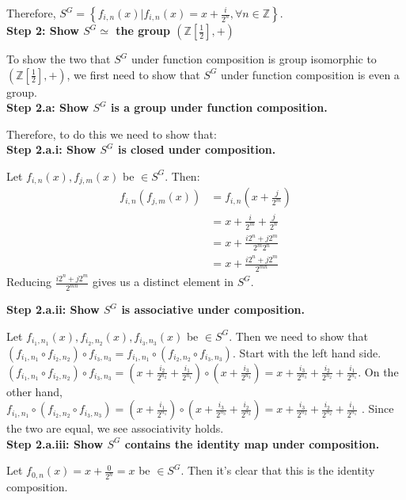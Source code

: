 \documentclass[12pt]{article}%
\newcommand{\Z}{\mathbb{Z}}
\begin{document}
Therefore, $S^G=\left\{f_{i,n}(x)|f_{i,n}(x)=x+\frac{i}{2^{n}}, \forall n\in \Z\right\}$.\\

\textbf{Step 2: Show $S^G\simeq$  the group $\left(\Z\left[\frac{1}{2}\right],+\right)$}

To show the two that $S^G$ under function composition is group isomorphic to
$\left(\Z\left[\frac{1}{2}\right],+\right)$, we first need to show that $S^G$ under function composition
is even a group. \\

\textbf{Step 2.a: Show $S^G$ is a group under function composition.}

Therefore, to do this we need to show that: \\

\textbf{Step 2.a.i: Show $S^G$ is closed under composition.}

Let $f_{i,n}(x), f_{j,m}(x)$ be $\in S^G$. Then: 
\begin{align*}
f_{i,n}(f_{j,m}(x))
&=f_{i,n}(x+\frac{j}{2^{m}}) \\
&=x+\frac{i}{2^{m}}+\frac{j}{2^{n}} \\
&=x+\frac{i2^{n}+j2^{m}}{2^{m}2^{n}} \\
&=x+\frac{i2^{n}+j2^{m}}{2^{mn}}
\end{align*}
Reducing $\frac{i2^{n}+j2^{m}}{2^{mn}}$ gives us a distinct element in $S^G$.

\textbf{Step 2.a.ii: Show $S^G$ is associative under composition.}

Let $f_{i_1,n_1}(x), f_{i_2,n_2}(x), f_{i_3,n_3}(x)$ be $\in S^G$. Then we need to show that
$(f_{i_1,n_1}\circ f_{i_2,n_2}) \circ f_{i_3,n_3}=f_{i_1,n_1}\circ (f_{i_2,n_2} \circ f_{i_3,n_3})$.
Start with the left hand side.
$(f_{i_1,n_1}\circ f_{i_2,n_2}) \circ f_{i_3,n_3} = (x+\frac{i_2}{2^{n_2}}+\frac{i_1}{2^{n_1}}) \circ (x+\frac{i_3}{2^{n_3}}) = x+\frac{i_3}{2^{n_3}}+\frac{i_2}{2^{n_2}}+\frac{i_1}{2^{n_1}}$. On the other
hand, $f_{i_1,n_1}\circ (f_{i_2,n_2} \circ f_{i_3,n_3})=(x+\frac{i_1}{2^{n_1}})\circ (x+\frac{i_3}{2^{n_3}}+\frac{i_2}{2^{n_2}})=x+\frac{i_3}{2^{n_3}}+\frac{i_2}{2^{n_2}}+\frac{i_1}{2^{n_1}}$
. Since the two are equal, we see associativity holds. \\

\textbf{Step 2.a.iii: Show $S^G$ contains the identity map under composition.}

Let $f_{0,n}(x)=x+\frac{0}{2^n}=x$ be $\in S^G$.  Then it's clear that this is the identity composition. \\
\end{document}
